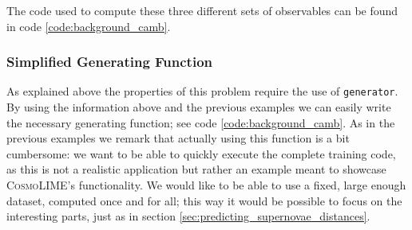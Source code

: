 The code used to compute these three different sets of observables can be found in code \ref{code:background_camb}.

\subsubsection{Simplified Generating Function}
As explained above the properties of this problem require the use of \texttt{generator}. By using the information above and the previous examples we can easily write the necessary generating function; see code \ref{code:background_camb}.
As in the previous examples we remark that actually using this function is a bit cumbersome: we want to be able to quickly execute the complete training code, as this is not a realistic application but rather an example meant to showcase \textsc{CosmoLIME}'s functionality. We would like to be able to use a fixed, large enough dataset, computed once and for all; this way it would be possible to focus on the interesting parts, just as in section \ref{sec:predicting_supernovae_distances}.

